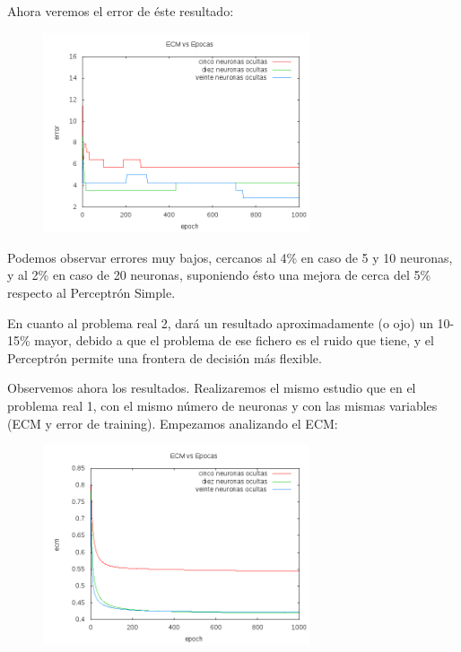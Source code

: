 \documentclass[12pt]{article}
\begin{document}
Ahora veremos el error de éste resultado:

\begin{figure}[h!]
    \label{fig:error_pr1}
  \centering
       \includegraphics[width=0.7\textwidth]{recursos/error_pr1}
\end{figure} 

Podemos observar errores muy bajos, cercanos al 4\% en caso de 5 y 10 neuronas, y al 2\% en caso de 20 neuronas, suponiendo ésto una mejora de cerca del 5\% respecto al Perceptrón Simple.

En cuanto al problema real 2, dará un resultado aproximadamente (o ojo) un 10-15\% mayor, debido a que el problema de ese fichero es el ruido que tiene, y el Perceptrón permite una frontera de decisión más flexible.

Observemos ahora los resultados. Realizaremos el mismo estudio que en el problema real 1, con el mismo número de neuronas y con las mismas variables (ECM y error de training). Empezamos analizando el ECM:

\begin{figure}[h!]
    \label{fig:ecm_pr2}
  \centering
       \includegraphics[width=0.7\textwidth]{recursos/ecm_pr2}
\end{figure} 
\end{document}
